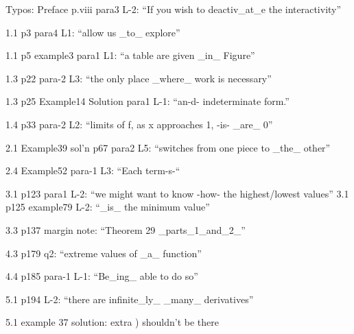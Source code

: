 Typos:
Preface p.viii para3 L-2: “If you wish to deactiv_at_e the interactivity”

1.1 p3 para4 L1: “allow us _to_ explore”

1.1 p5 example3 para1 L1: “a table are given _in_ Figure”

1.3 p22 para-2 L3: “the only place _where_ work is necessary”

1.3 p25 Example14 Solution para1 L-1: “an-d- indeterminate form.”

1.4 p33 para-2 L2: “limits of f, as x approaches 1, -is- _are_ 0”

2.1 Example39 sol’n p67 para2 L5: “switches from one piece to _the_ other”

2.4 Example52 para-1 L3: “Each term-s-“

3.1 p123 para1 L-2: “we might want to know -how- the highest/lowest values”
3.1 p125 example79 L-2: “_is_ the minimum value”

3.3 p137 margin note: “Theorem 29 _parts_1_and_2_”

4.3 p179 q2: “extreme values of _a_ function”

4.4 p185 para-1 L-1: “Be_ing_ able to do so”

5.1 p194 L-2: “there are infinite_ly_ _many_ derivatives”

5.1 example 37 solution: extra ) shouldn’t be there


